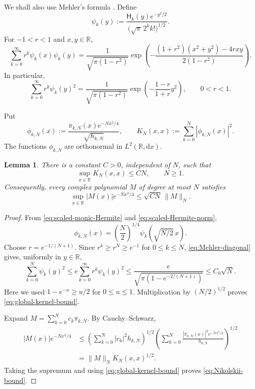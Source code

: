 \documentclass[11pt,reqno]{amsart}
\numberwithin{equation}{section}
\newtheorem{lemma}[theorem]{Lemma}
\theoremstyle{definition}
\theoremstyle{remark}
\newcommand{\R}{\mathbb R}
\newcommand{\1}{\mathbf 1}
\newcommand{\dd}{\mathrm d}
\begin{document}
We shall also use Mehler's formula \cite[Example~4.18]{Janson1997}.  Define
\[
  \psi_k(y)
  :=
  \frac{\mathsf H_k(y)e^{-y^2/2}}
       {\bigl(\sqrt\pi\,2^k k!\bigr)^{1/2}}.
\]
For \(-1<r<1\) and \(x,y\in\R\),
\[
  \sum_{k=0}^{\infty}r^k\psi_k(x)\psi_k(y)
  =
  \frac1{\sqrt{\pi(1-r^2)}}
  \exp\!\left(
    -\frac{(1+r^2)(x^2+y^2)-4rxy}{2(1-r^2)}
  \right).
\]
In particular,
\begin{equation}\label{eq:Mehler-diagonal}
  \sum_{k=0}^{\infty}r^k\psi_k(y)^2
  =
  \frac1{\sqrt{\pi(1-r^2)}}
  \exp\!\left(-\frac{1-r}{1+r}y^2\right),
  \qquad 0<r<1.
\end{equation}

Put
\[
  \phi_{k,N}(x)
  :=
  \frac{\pi_{k,N}(x)e^{-Nx^2/4}}{\sqrt{h_{k,N}}},
  \qquad
  K_N(x,x)
  :=
  \sum_{k=0}^N|\phi_{k,N}(x)|^2.
\]
The functions \(\phi_{k,N}\) are orthonormal in \(L^2(\R,\dd x)\).

\begin{lemma}\label{lem:kernel-Nikolskii}
There is a constant \(C>0\), independent of \(N\), such that
\begin{equation}\label{eq:global-kernel-bound}
  \sup_{x\in\R}K_N(x,x)\le CN,
  \qquad N\ge1.
\end{equation}
Consequently, every complex polynomial \(M\) of degree at most \(N\)
satisfies
\begin{equation}\label{eq:Nikolskii-bound}
  \sup_{x\in\R}|M(x)|e^{-Nx^2/4}
  \le
  \sqrt{CN}\,\|M\|_N.
\end{equation}
\end{lemma}

\begin{proof}
From \eqref{eq:scaled-monic-Hermite} and
\eqref{eq:scaled-Hermite-norm},
\[
  \phi_{k,N}(x)
  =
  \left(\frac N2\right)^{1/4}
  \psi_k\!\left(\sqrt{N/2}\,x\right).
\]
Choose \(r=e^{-1/(N+1)}\).  Since \(r^k\ge r^N\ge e^{-1}\) for
\(0\le k\le N\), \eqref{eq:Mehler-diagonal} gives, uniformly in
\(y\in\R\),
\[
  \sum_{k=0}^N\psi_k(y)^2
  \le
  e\sum_{k=0}^{\infty}r^k\psi_k(y)^2
  \le
  \frac{e}{\sqrt{\pi(1-e^{-2/(N+1)})}}
  \le
  C_0\sqrt N.
\]
Here we used \(1-e^{-u}\ge u/2\) for \(0\le u\le1\).  Multiplication by
\((N/2)^{1/2}\) proves \eqref{eq:global-kernel-bound}.

Expand \(M=\sum_{k=0}^Nc_k\pi_{k,N}\).  By Cauchy--Schwarz,
\begin{align*}
  |M(x)|e^{-Nx^2/4}
  &\le
  \left(\sum_{k=0}^N|c_k|^2h_{k,N}\right)^{1/2}
  \left(\sum_{k=0}^N
    \frac{|\pi_{k,N}(x)|^2e^{-Nx^2/2}}{h_{k,N}}
  \right)^{1/2}\\
  &=
  \|M\|_N K_N(x,x)^{1/2}.
\end{align*}
Taking the supremum and using \eqref{eq:global-kernel-bound} proves
\eqref{eq:Nikolskii-bound}.
\end{proof}
\end{document}
